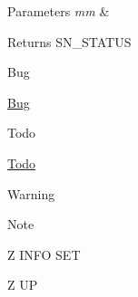 \begin{DoxyParams}{Parameters}
{\em mm} & \\
\hline
\end{DoxyParams}
\begin{DoxyReturn}{Returns}
S\+N\+\_\+\+S\+T\+A\+T\+US 
\end{DoxyReturn}
\begin{DoxyRefDesc}{Bug}
\item[\hyperlink{bug__bug000010}{Bug}]\end{DoxyRefDesc}
\begin{DoxyRefDesc}{Todo}
\item[\hyperlink{todo__todo000010}{Todo}]\end{DoxyRefDesc}
\begin{DoxyWarning}{Warning}

\end{DoxyWarning}
\begin{DoxyNote}{Note}

\end{DoxyNote}
Z I\+N\+FO S\+ET

Z UP 